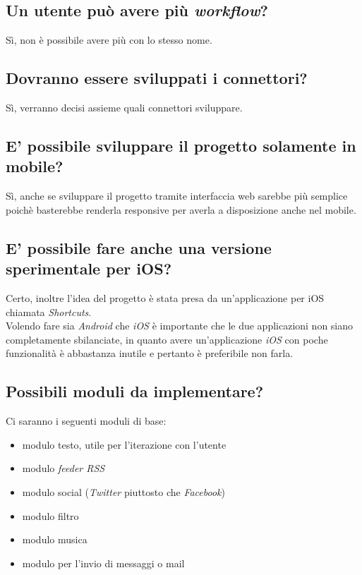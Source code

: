\documentclass[a4paper,12pt]{article}
\begin{document}
	\subsection{Un utente può avere più \textit{workflow}?}
	Sì, non è possibile avere più  con lo stesso nome.
	
	\subsection{Dovranno essere sviluppati i connettori?}
	Sì, verranno decisi assieme quali connettori sviluppare.
	
	\subsection{E' possibile sviluppare il progetto solamente in mobile?}
	Sì, anche se sviluppare il progetto  tramite interfaccia web sarebbe  più semplice poichè basterebbe renderla responsive per averla a disposizione anche nel mobile.
	
	\subsection{E' possibile fare anche una versione sperimentale per iOS?}
	Certo, inoltre l'idea del progetto è stata presa da un'applicazione per iOS chiamata \textit{Shortcuts}. \\
	Volendo fare sia \textit{Android} che \textit{iOS} è importante che le due applicazioni non siano completamente sbilanciate, in quanto avere un'applicazione \textit{iOS} con poche funzionalità è abbastanza inutile e pertanto è preferibile non farla.
	
	\subsection{Possibili moduli da implementare?}
	Ci saranno i seguenti moduli di base:
	\begin{itemize}
		\item modulo testo, utile per l'iterazione con l'utente 
		\item modulo \textit{feeder RSS} 
		\item modulo social (\textit{Twitter} piuttosto che \textit{Facebook})
		\item modulo filtro
		\item modulo musica
		\item modulo per l'invio di messaggi o mail
	\end{itemize}
\end{document}
